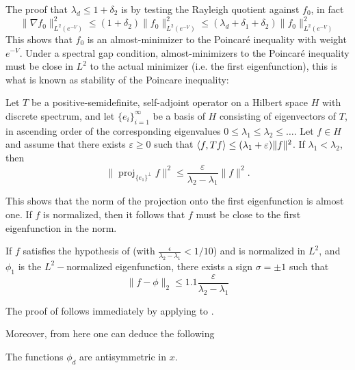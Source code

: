 The proof that $\lambda_d \le 1+\delta_2$ is by testing the Rayleigh quotient against $f_0$, in fact 
\begin{equation}\label{eq:f0_almost_minimizer}
{\|\nabla f_0\|^2_{L^2(e^{-V})}} \le (1+\delta_2) {\|f_0\|^2_{L^2(e^{-V})}} \le (\lambda_d + \delta_1 + \delta_2) {\|f_0\|^2_{L^2(e^{-V})}}
\end{equation}
This shows that $f_0$ is an almost-minimizer to the Poincaré inequality with weight $e^{-V}$. Under a spectral gap condition, almost-minimizers to the Poincaré inequality must be close in $L^2$ to the actual minimizer (i.e. the first eigenfunction), this is what is known as stability of the Poincare inequality:

\begin{theorem}\label{thm:stable_poincare}
Let \( T \) be a positive-semidefinite, self-adjoint operator on a Hilbert space \( H \) with discrete spectrum, and let \( \{e_i\}_{i=1}^{\infty} \) be a basis of \( H \) consisting of eigenvectors of \( T \), in ascending order of the corresponding eigenvalues \( 0 \le \lambda_1 \le \lambda_2 \le \ldots \). Let \( f \in H \) and assume that there exists \( \varepsilon \geq 0 \) such that $\langle f, Tf \rangle \le (\lambda_1 + \varepsilon)\|f\|^2$.
    If \( \lambda_1 < \lambda_2 \), then
    \[
        \|\operatorname{proj}_{\{e_1\}^\perp} f\|^2 \le \frac{\varepsilon}{\lambda_2-\lambda_1} \|f\|^2.
    \]
\end{theorem}

This shows that the norm of the projection onto the first eigenfunction is almost one. If $f$ is normalized, then it follows that $f$ must be close to the first eigenfunction in the norm.

\begin{corollary}\label{cor:the_poincare_we_need}
If $f$ satisfies the hypothesis of  (with $\frac{\epsilon}{\lambda_2 - \lambda_1}<1/10$) and is normalized in $L^2$, and $\phi_1$ is the $L^2-$normalized eigenfunction, there exists a sign $\sigma=\pm 1$ such that 
$$
\|f-\phi\|_2 \le 1.1 \frac{\varepsilon}{\lambda_2 - \lambda_1}
$$
\end{corollary}

The proof of  follows immediately by applying  to .


Moreover, from here one can deduce the following

\begin{proposition}
    The functions $\phi_d$ are antisymmetric in $x$.
\end{proposition}

